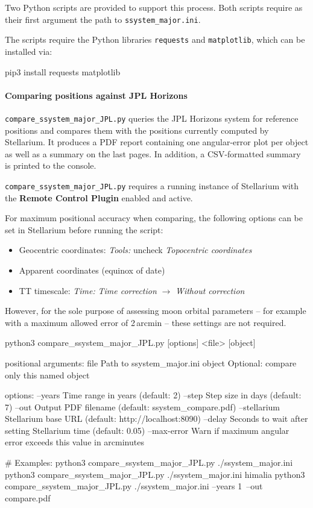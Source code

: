 Two Python scripts are provided to support this process. Both scripts require as their first
argument the path to \texttt{ssystem\_major.ini}.

The scripts require the Python libraries \texttt{requests} and \texttt{matplotlib}, which
can be installed via:
\begin{commands}
pip3 install requests matplotlib
\end{commands}

\paragraph{Comparing positions against JPL Horizons}


\texttt{compare\_ssystem\_major\_JPL.py} queries the JPL Horizons system for reference
positions and compares them with the positions currently computed by Stellarium. It
produces a PDF report containing one angular-error plot per object as well as a summary
on the last pages. In addition, a CSV-formatted summary is printed to the console.

\texttt{compare\_ssystem\_major\_JPL.py} requires a running instance of Stellarium with
the \textbf{Remote Control Plugin} enabled and active.

For maximum positional accuracy when comparing, the following options can be set in
Stellarium before running the script:
\begin{itemize}
  \item Geocentric coordinates: \textit{Tools:} uncheck \textit{Topocentric coordinates}
  \item Apparent coordinates (equinox of date)
  \item TT timescale: \textit{Time:} \textit{Time correction} $\rightarrow$ \textit{Without correction}
\end{itemize}
However, for the sole purpose of assessing moon orbital parameters -- for example with a
maximum allowed error of 2\,arcmin -- these settings are not required.

\begin{commands}
python3 compare_ssystem_major_JPL.py [options] <file> [object]

positional arguments:
  file        Path to ssystem_major.ini
  object      Optional: compare only this named object

options:
  --years     Time range in years (default: 2)
  --step      Step size in days (default: 7)
  --out       Output PDF filename (default: ssystem_compare.pdf)
  --stellarium  Stellarium base URL (default: http://localhost:8090)
  --delay     Seconds to wait after setting Stellarium time
              (default: 0.05)
  --max-error Warn if maximum angular error exceeds this value in
              arcminutes

# Examples:
python3 compare_ssystem_major_JPL.py ./ssystem_major.ini
python3 compare_ssystem_major_JPL.py ./ssystem_major.ini himalia
python3 compare_ssystem_major_JPL.py ./ssystem_major.ini --years 1\
  --out compare.pdf
\end{commands}

